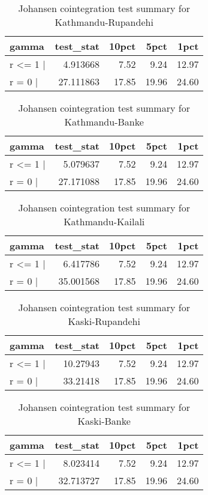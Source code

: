 \documentclass[
  12pt,
]{article}
\begin{document}
\begin{longtable}[t]{lrrrr}
\caption{\label{tab:wheat-cajo-test}Johansen cointegration test summary for Kathmandu-Rupandehi}\\
\toprule
gamma & test\_stat & 10pct & 5pct & 1pct\\
\midrule
r <= 1 | & 4.913668 & 7.52 & 9.24 & 12.97\\
r = 0  | & 27.111863 & 17.85 & 19.96 & 24.60\\
\bottomrule
\end{longtable}

\begin{longtable}[t]{lrrrr}
\caption{\label{tab:wheat-cajo-test}Johansen cointegration test summary for Kathmandu-Banke}\\
\toprule
gamma & test\_stat & 10pct & 5pct & 1pct\\
\midrule
r <= 1 | & 5.079637 & 7.52 & 9.24 & 12.97\\
r = 0  | & 27.171088 & 17.85 & 19.96 & 24.60\\
\bottomrule
\end{longtable}

\begin{longtable}[t]{lrrrr}
\caption{\label{tab:wheat-cajo-test}Johansen cointegration test summary for Kathmandu-Kailali}\\
\toprule
gamma & test\_stat & 10pct & 5pct & 1pct\\
\midrule
r <= 1 | & 6.417786 & 7.52 & 9.24 & 12.97\\
r = 0  | & 35.001568 & 17.85 & 19.96 & 24.60\\
\bottomrule
\end{longtable}

\begin{longtable}[t]{lrrrr}
\caption{\label{tab:wheat-cajo-test}Johansen cointegration test summary for Kaski-Rupandehi}\\
\toprule
gamma & test\_stat & 10pct & 5pct & 1pct\\
\midrule
r <= 1 | & 10.27943 & 7.52 & 9.24 & 12.97\\
r = 0  | & 33.21418 & 17.85 & 19.96 & 24.60\\
\bottomrule
\end{longtable}

\begin{longtable}[t]{lrrrr}
\caption{\label{tab:wheat-cajo-test}Johansen cointegration test summary for Kaski-Banke}\\
\toprule
gamma & test\_stat & 10pct & 5pct & 1pct\\
\midrule
r <= 1 | & 8.023414 & 7.52 & 9.24 & 12.97\\
r = 0  | & 32.713727 & 17.85 & 19.96 & 24.60\\
\bottomrule
\end{longtable}
\end{document}
